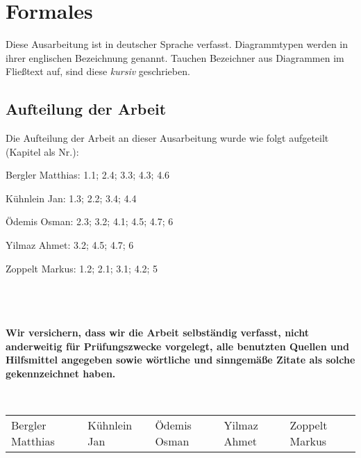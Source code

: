 \chapter*{Formales}

Diese Ausarbeitung ist in deutscher Sprache verfasst. Diagrammtypen werden in ihrer englischen Bezeichnung genannt. Tauchen Bezeichner aus Diagrammen im Fließtext auf, sind diese \emph{kursiv} geschrieben.

\section*{Aufteilung der Arbeit}
Die Aufteilung der Arbeit an dieser Ausarbeitung wurde wie folgt aufgeteilt (Kapitel als Nr.):

Bergler Matthias: 1.1; 2.4; 3.3; 4.3; 4.6

Kühnlein Jan: 1.3; 2.2; 3.4; 4.4

Ödemis Osman: 2.3; 3.2; 4.1; 4.5; 4.7; 6

Yilmaz Ahmet: 3.2; 4.5; 4.7; 6

Zoppelt Markus: 1.2; 2.1; 3.1; 4.2; 5

\ \\
\ \\
\ \\
\textbf{Wir versichern, dass wir die Arbeit selbständig verfasst, nicht anderweitig für
Prüfungszwecke vorgelegt, alle benutzten Quellen und Hilfsmittel angegeben
sowie wörtliche und sinngemäße Zitate als solche gekennzeichnet haben.}

\ \\
\begin{table}[h]
\centering
\begin{tabular}{lllll}
\hline
Bergler Matthias & Kühnlein Jan & Ödemis Osman & Yilmaz Ahmet & Zoppelt Markus \\
\end{tabular}
\end{table}
